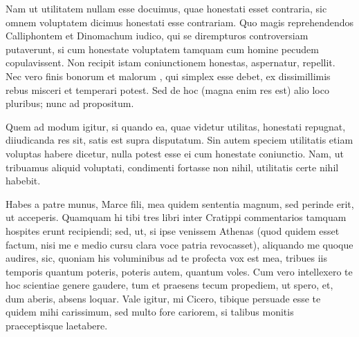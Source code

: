  Nam ut utilitatem nullam esse docuimus, quae honestati esset contraria, sic omnem voluptatem dicimus honestati esse contrariam. Quo magis reprehendendos Calliphontem et Dinomachum iudico, qui se dirempturos controversiam putaverunt, si cum honestate voluptatem tamquam cum homine pecudem copulavissent. Non recipit istam coniunctionem honestas, aspernatur, repellit. Nec vero finis bonorum et malorum , qui simplex esse debet, ex dissimillimis rebus misceri et temperari potest. Sed de hoc (magna enim res est) alio loco pluribus; nunc ad propositum.

 Quem ad modum igitur, si quando ea, quae videtur utilitas, honestati repugnat, diiudicanda res sit, satis est supra disputatum. Sin autem speciem utilitatis etiam voluptas habere dicetur, nulla potest esse ei cum honestate coniunctio. Nam, ut tribuamus aliquid voluptati, condimenti fortasse non nihil, utilitatis certe nihil habebit.

 Habes a patre munus, Marce fili, mea quidem sententia magnum, sed perinde erit, ut acceperis. Quamquam hi tibi tres libri inter Cratippi commentarios tamquam hospites erunt recipiendi; sed, ut, si ipse venissem Athenas (quod quidem esset factum, nisi me e medio cursu clara voce patria revocasset), aliquando me quoque audires, sic, quoniam his voluminibus ad te profecta vox est mea, tribues iis temporis quantum poteris, poteris autem, quantum voles. Cum vero intellexero te hoc scientiae genere gaudere, tum et praesens tecum propediem, ut spero, et, dum aberis, absens loquar. Vale igitur, mi Cicero, tibique persuade esse te quidem mihi carissimum, sed multo fore cariorem, si talibus monitis praeceptisque laetabere.
